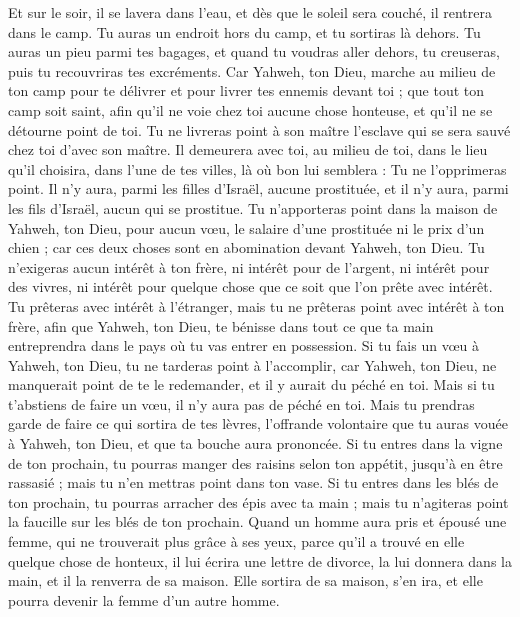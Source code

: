 \begin{multicols}{2}
Et sur le soir, il se lavera dans l’eau, et dès que le soleil sera couché, il rentrera dans le camp.
Tu auras un endroit hors du camp, et tu sortiras là dehors.
Tu auras un pieu parmi tes bagages, et quand tu voudras aller dehors, tu creuseras, puis tu recouvriras tes excréments.
Car Yahweh, ton Dieu, marche au milieu de ton camp pour te délivrer et pour livrer tes ennemis devant toi ; que tout ton camp soit saint, afin qu'il ne voie chez toi aucune chose honteuse, et qu'il ne se détourne point de toi.
Tu ne livreras point à son maître l’esclave qui se sera sauvé chez toi d'avec son maître.
Il demeurera avec toi, au milieu de toi, dans le lieu qu'il choisira, dans l'une de tes villes, là où bon lui semblera : Tu ne l’opprimeras point.
Il n’y aura, parmi les filles d'Israël, aucune prostituée, et il n’y aura, parmi les fils d’Israël, aucun qui se prostitue.
Tu n'apporteras point dans la maison de Yahweh, ton Dieu, pour aucun vœu, le salaire d'une prostituée ni le prix d'un chien ; car ces deux choses sont en abomination devant Yahweh, ton Dieu.
Tu n’exigeras aucun intérêt à ton frère, ni intérêt pour de l’argent, ni intérêt pour des vivres, ni intérêt pour quelque chose que ce soit que l'on prête avec intérêt.
Tu prêteras avec intérêt à l'étranger, mais tu ne prêteras point avec intérêt à ton frère, afin que Yahweh, ton Dieu, te bénisse dans tout ce que ta main entreprendra dans le pays où tu vas entrer en possession.
Si tu fais un vœu à Yahweh, ton Dieu, tu ne tarderas point à l'accomplir, car Yahweh, ton Dieu, ne manquerait point de te le redemander, et il y aurait du péché en toi.
Mais si tu t'abstiens de faire un vœu, il n'y aura pas de péché en toi.
Mais tu prendras garde de faire ce qui sortira de tes lèvres, l’offrande volontaire que tu auras vouée à Yahweh, ton Dieu, et que ta bouche aura prononcée.
Si tu entres dans la vigne de ton prochain, tu pourras manger des raisins selon ton appétit, jusqu'à en être rassasié ; mais tu n'en mettras point dans ton vase.
Si tu entres dans les blés de ton prochain, tu pourras arracher des épis avec ta main ; mais tu n’agiteras point la faucille sur les blés de ton prochain.
\VerseOne{}Quand un homme aura pris et épousé une femme, qui ne trouverait plus grâce à ses yeux, parce qu’il a trouvé en elle quelque chose de honteux, il lui écrira une lettre de divorce, la lui donnera dans la main, et il la renverra de sa maison.
Elle sortira de sa maison, s’en ira, et elle pourra devenir la femme d’un autre homme.

\end{multicols}
